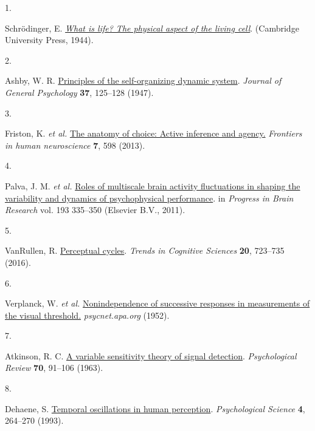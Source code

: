 \documentclass[
]{article}
\newlength{\cslhangindent}
\newlength{\csllabelwidth}
\newlength{\cslentryspacingunit} %
\newenvironment{CSLReferences}[2] %
 {%
  \setlength{\parindent}{0pt}
  \ifodd #1
  \let\oldpar\par
  \def\par{\hangindent=\cslhangindent\oldpar}
  \fi
  \setlength{\parskip}{#2\cslentryspacingunit}
 }%
 {}
\newcommand{\CSLLeftMargin}[1]{\parbox[t]{\csllabelwidth}{#1}}
\newcommand{\CSLRightInline}[1]{\parbox[t]{\linewidth - \csllabelwidth}{#1}\break}
\begin{document}
\hypertarget{refs}{}
\begin{CSLReferences}{0}{0}
\leavevmode{}%
\CSLLeftMargin{1. }%
\CSLRightInline{Schrödinger, E.
\emph{\href{http://filf.pskgu.ru/ebooks/schbio/schbio_titul.pdf}{What is
life? The physical aspect of the living cell}}. (Cambridge University
Press, 1944).}

\leavevmode{}%
\CSLLeftMargin{2. }%
\CSLRightInline{Ashby, W. R.
\href{https://doi.org/10.1080/00221309.1947.9918144}{Principles of the
self-organizing dynamic system}. \emph{Journal of General Psychology}
\textbf{37}, 125--128 (1947).}

\leavevmode{}%
\CSLLeftMargin{3. }%
\CSLRightInline{Friston, K. \emph{et al.}
\href{https://doi.org/10.3389/fnhum.2013.00598}{The anatomy of choice:
Active inference and agency.} \emph{Frontiers in human neuroscience}
\textbf{7}, 598 (2013).}

\leavevmode{}%
\CSLLeftMargin{4. }%
\CSLRightInline{Palva, J. M. \emph{et al.}
\href{https://doi.org/10.1016/B978-0-444-53839-0.00022-3}{Roles of
multiscale brain activity fluctuations in shaping the variability and
dynamics of psychophysical performance}. in \emph{Progress in Brain
Research} vol. 193 335--350 (Elsevier B.V., 2011).}

\leavevmode{}%
\CSLLeftMargin{5. }%
\CSLRightInline{VanRullen, R.
\href{https://doi.org/10.1016/j.tics.2016.07.006}{Perceptual cycles}.
\emph{Trends in Cognitive Sciences} \textbf{20}, 723--735 (2016).}

\leavevmode{}%
\CSLLeftMargin{6. }%
\CSLRightInline{Verplanck, W. \emph{et al.}
\href{https://psycnet.apa.org/record/1953-04864-001}{Nonindependence of
successive responses in measurements of the visual threshold.}
\emph{psycnet.apa.org} (1952).}

\leavevmode{}%
\CSLLeftMargin{7. }%
\CSLRightInline{Atkinson, R. C.
\href{https://doi.org/10.1037/h0041428}{A variable sensitivity theory of
signal detection}. \emph{Psychological Review} \textbf{70}, 91--106
(1963).}

\leavevmode{}%
\CSLLeftMargin{8. }%
\CSLRightInline{Dehaene, S.
\href{https://doi.org/10.1111/j.1467-9280.1993.tb00273.x}{Temporal
oscillations in human perception}. \emph{Psychological Science}
\textbf{4}, 264--270 (1993).}


\end{CSLReferences}
\end{document}
